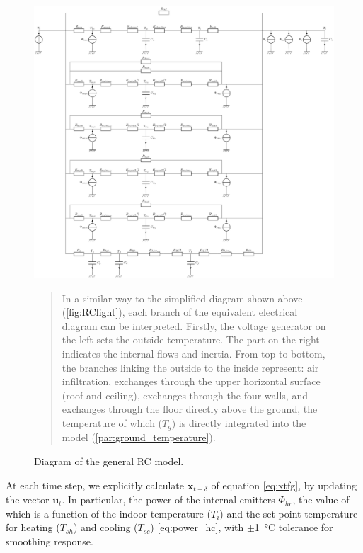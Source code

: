 \documentclass[11pt]{article}
\begin{document}
        \begin{figure}[ht]
            \centering
            \includegraphics[width=0.99\columnwidth]{figures/genmod.pdf}
            \caption{\label{fig:rc_mod} Diagram of the general RC model.}
            \begin{quote}
                \vspace{-2mm}
                \small\noindent
                In a similar way to the simplified diagram shown above (\ref{fig:RClight}), each branch of the equivalent electrical diagram can be interpreted. Firstly, the voltage generator on the left sets the outside temperature. The part on the right indicates the internal flows and inertia. From top to bottom, the branches linking the outside to the inside represent: air infiltration, exchanges through the upper horizontal surface (roof and ceiling), exchanges through the four walls, and exchanges through the floor directly above the ground, the temperature of which ($T_g$) is directly integrated into the model (\ref{par:ground_temperature}). 
              \end{quote}
        \end{figure} 

        At each time step, we explicitly calculate $\mathbf{x}_{t+\delta}$ of equation \eqref{eq:xtfg}, by updating the vector $\mathbf{u}_{t}$. In particular, the power of the internal emitters $\Phi_{hc}$, the value of which is a function of the indoor temperature ($T_i$) and the set-point temperature for heating ($T_{sh}$) and cooling ($T_{sc}$) \eqref{eq:power_hc}, with $\pm$\SI{1}{\celsius} tolerance for smoothing response. 
\end{document}
